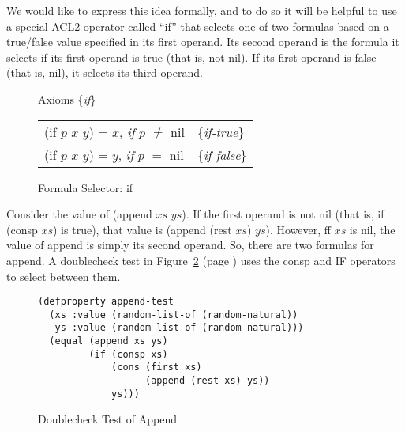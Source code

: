 We would like to express this idea formally,
and to do so it will be helpful to use a special ACL2 operator
called ``if''
that selects one of two formulas based on a true/false
value specified in its first operand.
Its second operand is the formula it selects if
its first operand is true (that is, not nil).
If its first operand is false (that is, nil),
it selects its third operand.

\begin{figure}
\begin{center}
Axioms \{\emph{if}\} \\
\begin{tabular}{ll}
(if $p$ $x$ $y$) = $x$, \emph{if} $p$ $\neq$ nil  & \{\emph{if-true}\}  \\
(if $p$ $x$ $y$) = $y$, \emph{if} $p$ $=$ nil     & \{\emph{if-false}\} \\
\end{tabular}
\end{center}
\caption{Formula Selector: if}
\label{fig:if-axioms}
\end{figure}

Consider the value of (append $xs$ $ys$).
If the first operand is not nil (that is, if (consp $xs$) is true),
that value is (append (rest $xs$) $ys$).
However, ff $xs$ is nil, the value of append
is simply its second operand.
So, there are two formulas for append.
A doublecheck test in Figure~\ref{fig:append-test} (page \pageref{fig:append-test})
uses the consp and IF operators to select between them.

\begin{figure}
\begin{Verbatim}
(defproperty append-test
  (xs :value (random-list-of (random-natural))
   ys :value (random-list-of (random-natural)))
  (equal (append xs ys)
         (if (consp xs)
             (cons (first xs)
                   (append (rest xs) ys))
             ys)))
\end{Verbatim}
\caption{Doublecheck Test of Append}
\label{fig:append-test}
\end{figure}

